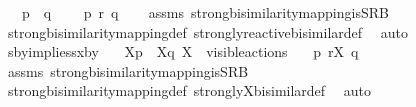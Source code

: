 \begin{isabellebody}
\ \ \ {\isacartoucheopen}{\isasymtheta}{\isacharparenleft}{\kern0pt}p{\isacharparenright}{\kern0pt}\ {\isasymleftrightarrow}\ {\isasymtheta}{\isacharparenleft}{\kern0pt}q{\isacharparenright}{\kern0pt}{\isacartoucheclose}\ \isanewline
\ \ \ {\isacartoucheopen}p\ {\isasymleftrightarrow}\isactrlsub r\ q{\isacartoucheclose}\isanewline
%
\isadelimproof
\ \ %
\endisadelimproof
%
\isatagproof
{}\isamarkupfalse%
\ assms\ strong{\isacharunderscore}{\kern0pt}bisimilarity{\isacharunderscore}{\kern0pt}mapping{\isacharunderscore}{\kern0pt}is{\isacharunderscore}{\kern0pt}SRB\isanewline
\ \ \isamarkupfalse%
\ strong{\isacharunderscore}{\kern0pt}bisimilarity{\isacharunderscore}{\kern0pt}mapping{\isacharunderscore}{\kern0pt}def\ strongly{\isacharunderscore}{\kern0pt}reactive{\isacharunderscore}{\kern0pt}bisimilar{\isacharunderscore}{\kern0pt}def\ \isamarkupfalse%
\ auto%
\endisatagproof
{\isafoldproof}%
%
\isadelimproof
\isanewline
%
\endisadelimproof
\isanewline
{}\isamarkupfalse%
\ sby{\isacharunderscore}{\kern0pt}implies{\isacharunderscore}{\kern0pt}sxby{\isacharcolon}{\kern0pt}\isanewline
\ \ \ {\isacartoucheopen}{\isasymtheta}{\isacharbrackleft}{\kern0pt}X{\isacharbrackright}{\kern0pt}{\isacharparenleft}{\kern0pt}p{\isacharparenright}{\kern0pt}\ {\isasymleftrightarrow}\ {\isasymtheta}{\isacharbrackleft}{\kern0pt}X{\isacharbrackright}{\kern0pt}{\isacharparenleft}{\kern0pt}q{\isacharparenright}{\kern0pt}{\isacartoucheclose}\ {\isacartoucheopen}X\ {\isasymsubseteq}\ visible{\isacharunderscore}{\kern0pt}actions{\isacartoucheclose}\isanewline
\ \ \ {\isacartoucheopen}p\ {\isasymleftrightarrow}\isactrlsub r\isactrlsup X\ q{\isacartoucheclose}%
\isadelimproof
\ %
\endisadelimproof
%
\isatagproof
{}\isamarkupfalse%
\ assms\ strong{\isacharunderscore}{\kern0pt}bisimilarity{\isacharunderscore}{\kern0pt}mapping{\isacharunderscore}{\kern0pt}is{\isacharunderscore}{\kern0pt}SRB\isanewline
\ \ \isamarkupfalse%
\ strong{\isacharunderscore}{\kern0pt}bisimilarity{\isacharunderscore}{\kern0pt}mapping{\isacharunderscore}{\kern0pt}def\ strongly{\isacharunderscore}{\kern0pt}X{\isacharunderscore}{\kern0pt}bisimilar{\isacharunderscore}{\kern0pt}def\ \isamarkupfalse%
\ auto%
\endisatagproof
{\isafoldproof}%
%
\isadelimproof
%
\endisadelimproof
%
\begin{isamarkuptext}%

\end{isamarkuptext}
\end{isabellebody}
